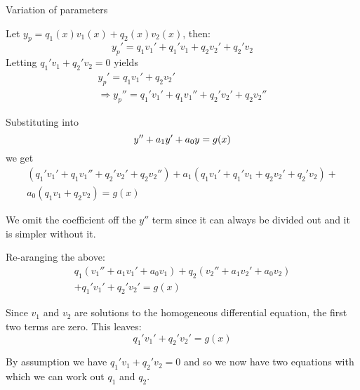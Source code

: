 \documentclass[a4paper,10pt]{article}
\begin{document}
Variation of parameters

Let $y_p = q_1(x) v_1(x) + q_2(x) v_2(x)$, then:
\[
	y_p' = q_1v_1' + q_1'v_1 + q_2v_2' + q_2'v_2
\]
Letting $q_1'v_1 + q_2'v_2 = 0$ yields
\begin{gather*}
	y_p' = q_1v_1' + q_2v_2' \\
	\Rightarrow y_p'' = q_1'v_1' + q_1v_1'' + q_2'v_2' + q_2v_2''
\end{gather*}

Substituting into
\[
	y'' + a_1 y' + a_0 y = g(x) \\
\]
we get
\begin{multline*}
	(q_1'v_1' + q_1v_1'' + q_2'v_2' + q_2v_2'') +
	a_1(q_1v_1' + q_1'v_1 + q_2v_2' + q_2'v_2) + \\
	a_0(q_1v_1 + q_2v_2) = g(x)
\end{multline*}

We omit the coefficient off the $y''$ term since it can always be
divided out and it is simpler without it.

Re-aranging the above:
\begin{multline*}
	q_1(v_1'' + a_1v_1' + a_0v_1) + q_2(v_2'' + a_1v_2' + a_0v_2) \\
	+ q_1'v_1' + q_2'v_2' = g(x)
\end{multline*}

Since $v_1$ and $v_2$ are solutions to the homogeneous differential
equation, the first two terms are zero. This leaves:
\[
	q_1'v_1' + q_2'v_2' = g(x)
\]

By assumption we have $q_1'v_1 + q_2'v_2 = 0$ and so we now have two
equations with which we can work out $q_1$ and $q_2$.
\end{document}
